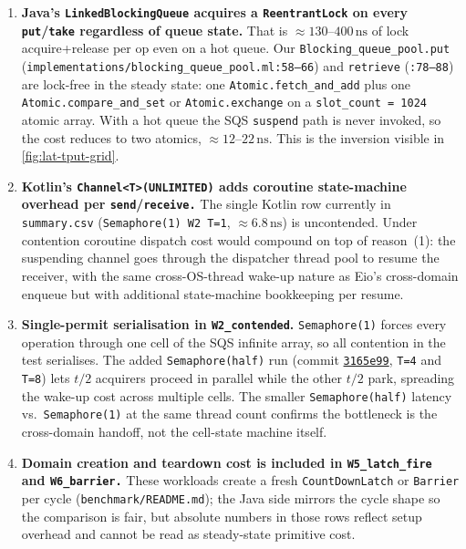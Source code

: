 \documentclass[11pt,a4paper]{article}
\newcommand{\commit}[1]{%
  \href{https://github.com/durwasa-chakraborty/CS6868_Concurrent_Programming_Project/commit/#1}%
       {\texttt{#1}}}
\begin{document}
\begin{enumerate}
\item \textbf{Java's \texttt{LinkedBlockingQueue} acquires a
  \texttt{ReentrantLock} on every \texttt{put}/\texttt{take} regardless
  of queue state.} That is $\approx 130\text{--}400\,\text{ns}$ of
  lock acquire+release per op even on a hot queue. Our
  \texttt{Blocking\_queue\_pool.put}
  (\texttt{implementations/blocking\_queue\_pool.ml:58--66}) and
  \texttt{retrieve} (\texttt{:78--88}) are lock-free in the steady
  state: one \texttt{Atomic.fetch\_and\_add} plus one
  \texttt{Atomic.compare\_and\_set} or \texttt{Atomic.exchange} on a
  \texttt{slot\_count = 1024} atomic array. With a hot queue the SQS
  \texttt{suspend} path is never invoked, so the cost reduces to two
  atomics, $\approx 12\text{--}22\,\text{ns}$. This is the inversion
  visible in \cref{fig:lat-tput-grid}.

\item \textbf{Kotlin's \texttt{Channel<T>(UNLIMITED)} adds coroutine
  state-machine overhead per \texttt{send}/\texttt{receive.}} The
  single Kotlin row currently in \texttt{summary.csv}
  (\texttt{Semaphore(1) W2 T=1}, $\approx 6.8\,\text{ns}$) is
  uncontended. Under contention coroutine dispatch cost would
  compound on top of reason~(1): the suspending channel goes through
  the dispatcher thread pool to resume the receiver, with the same
  cross-OS-thread wake-up nature as Eio's cross-domain enqueue but
  with additional state-machine bookkeeping per resume.

\item \textbf{Single-permit serialisation in \texttt{W2\_contended}.}
  \texttt{Semaphore(1)} forces every operation through one cell of the
  SQS infinite array, so all contention in the test serialises. The
  added \texttt{Semaphore(half)} run (commit \commit{3165e99},
  \texttt{T=4} and \texttt{T=8}) lets $t/2$ acquirers proceed in
  parallel while the other $t/2$ park, spreading the wake-up cost
  across multiple cells. The smaller \texttt{Semaphore(half)} latency
  vs.\ \texttt{Semaphore(1)} at the same thread count confirms the
  bottleneck is the cross-domain handoff, not the cell-state machine
  itself.

\item \textbf{Domain creation and teardown cost is included in
  \texttt{W5\_latch\_fire} and \texttt{W6\_barrier.}} These workloads
  create a fresh \texttt{CountDownLatch} or \texttt{Barrier} per cycle
  (\texttt{benchmark/README.md}); the Java side mirrors the cycle
  shape so the comparison is fair, but absolute numbers in those rows
  reflect setup overhead and cannot be read as steady-state primitive
  cost.


\end{enumerate}
\end{document}
